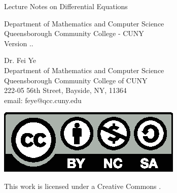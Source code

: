 
\begin{titlepage}
	\thispagestyle{empty}%

	\begin{center}
		\bfseries
		\vspace*{2\baselineskip}
		{\huge\raggedright \color{main} Lecture Notes on Differential Equations \par}
		{\LARGE\raggedleft \color{third}{Fei Ye}\par}%
	\end{center}%
	\vspace*{10\baselineskip}
	\vfill
	\color{second}
	\begin{center}
		{
		\large\color{second}
		Department of Mathematics and Computer Science\\[1ex]
		Queensborough Community College - CUNY\\[3ex]
		}
		{\cyan
		 Version \number\year.\number\month.\number\day
		}
	\end{center}

	\vspace*{1\baselineskip}

\end{titlepage}

\thispagestyle{empty}

\vspace*{2\baselineskip}


\begin{flushleft}
  Dr. Fei Ye\\
  Department of Mathematics and Computer Science\\
  Queensborough Community College of CUNY\\
  222-05 56th Street, Bayside, NY, 11364\\
  email: feye@qcc.cuny.edu

  \null\vfill








  \includegraphics{pics/by-nc-sa.eps}

  This work is licensed under a Creative Commons
  \href{https://creativecommons.org/licenses/by-nc-sa/4.0/}{}.

\end{flushleft}

\newpage